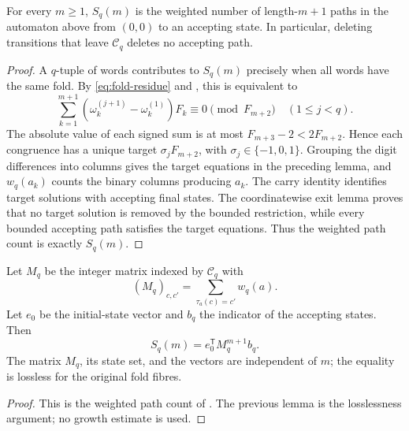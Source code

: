 \begin{lemma}
\label{lem:bounded-signed-fibonacci-carry}
For every \(m\ge1\), \(S_q(m)\) is the weighted number of length-\(m+1\)
paths in the automaton above from \((0,0)\) to an accepting state.
In particular, deleting transitions that leave \(\mathcal C_q\) deletes no
accepting path.
\end{lemma}
\begin{proof}
A \(q\)-tuple of words contributes to \(S_q(m)\) precisely when all words have
the same fold.  By \eqref{eq:fold-residue} and
, this is equivalent to
\[
 \sum_{k=1}^{m+1}(\omega_k^{(j+1)}-\omega_k^{(1)})F_k
 \equiv0\pmod {F_{m+2}}\quad(1\le j<q).
\]
The absolute value of each signed sum is at most
\(F_{m+3}-2<2F_{m+2}\).  Hence each congruence has a unique target
\(\sigma_jF_{m+2}\), with \(\sigma_j\in\{-1,0,1\}\).  Grouping the digit
differences into columns gives the target equations in the preceding lemma,
and \(w_q(a_k)\) counts the binary columns producing \(a_k\).
The carry identity identifies target solutions with accepting final states.
The coordinatewise exit lemma proves that no target solution is removed by
the bounded restriction, while every bounded accepting path satisfies the
target equations.  Thus the weighted path count is exactly \(S_q(m)\).
\end{proof}

\begin{theorem}
\label{thm:audited-fixed-degree-transfer-interface}
Let \(M_q\) be the integer matrix indexed by \(\mathcal C_q\) with
\[
 (M_q)_{c,c'}=\sum_{\tau_a(c)=c'}w_q(a).
\]
Let \(e_0\) be the initial-state vector and \(b_q\) the indicator of the
accepting states.  Then
\[
 S_q(m)=e_0^{\mathsf T}M_q^{m+1}b_q .
\]
The matrix \(M_q\), its state set, and the vectors are independent of \(m\);
the equality is lossless for the original fold fibres.
\end{theorem}
\begin{proof}
This is the weighted path count of
.  The previous lemma is the
losslessness argument; no growth estimate is used.
\end{proof}

